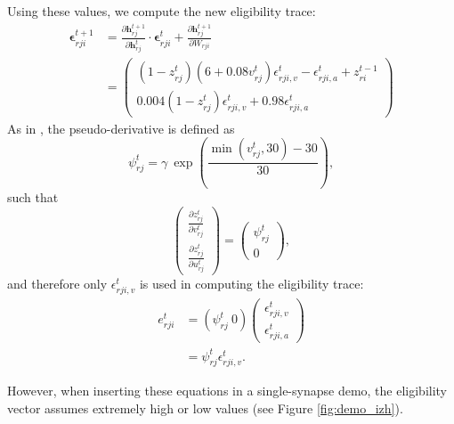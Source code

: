 			Using these values, we compute the new eligibility trace:
	        \begin{align}
	        \bm{\epsilon}^{t+1}_{rji} &= \frac{\partial\mathbf{h}^{t+1}_{rj}}{\partial\mathbf{h}^t_{rj}}\cdot\bm{\epsilon}^t_{rji} + \frac{\partial\mathbf{h}^{t+1}_{rj}}{\partial W_{rji}}\\
	        &= \begin{pmatrix}\left(1-z^t_{rj}\right)\left(6+0.08v^t_{rj}\right)\epsilon^t_{rji, v} -\epsilon^t_{rji, a} + z_{ri}^{t-1}\\
	        0.004\left(1-z^t_{rj}\right)\epsilon^t_{rji, v} + 0.98\epsilon^t_{rji, a}
	        \end{pmatrix}\label{eq:ml_izhikevich_evector}
	        \end{align}
	        As in \citet{traub2020learning}, the pseudo-derivative is defined as
	        \begin{equation}
	        \psi^t_{rj} = \gamma\ \exp\left(\frac{\min\left(v^t_{rj}, 30\right) - 30}{30}\right),
	        \end{equation}
	        such that
	        \begin{equation}
	        \begin{pmatrix}\frac{\partial z^t_{rj}}{\partial v^t_{rj}}\\\frac{\partial z^t_{rj}}{\partial u^t_{rj}}\end{pmatrix}
	        = \begin{pmatrix}\psi^t_{rj}\\0\end{pmatrix},
	        \end{equation}
	        and therefore only $\epsilon^t_{rji, v}$ is used in computing the eligibility trace:
	        \begin{align}
	        e^t_{rji} &= \left(\psi^t_{rj}\ 0\right)\begin{pmatrix}\epsilon^t_{rji, v}\\\epsilon^t_{rji, a}\end{pmatrix} \\
	        &= \psi^t_{rj}\epsilon^t_{rji, v}.
	        \end{align}

	    However, when inserting these equations in a single-synapse demo, the eligibility vector assumes extremely high or low values (see Figure \ref{fig:demo_izh}).

